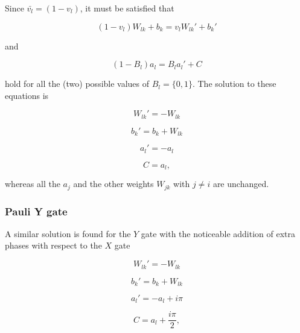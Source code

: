 Since $\bar{v_{l}} = (1-v_{l})$, it must be satisfied that

\begin{equation}
    (1-v_{l})W_{lk} + b_{k} = v_{l} W_{lk}\prime + b_{k}\prime
\end{equation}

and

\begin{equation}
   (1-B_{l}) a_{l} = B_{l} a_{l}\prime + C 
\end{equation}

hold for all the (two) possible values of $B_{l} = \{0,1\}$. The solution to these equations is

\begin{equation}
   W_{lk}\prime = -W_{lk}
\end{equation}

\begin{equation}
   b_{k}\prime = b_{k} + W_{lk}
\end{equation}

\begin{equation}
   a_{l}\prime = -a_{l}
\end{equation}

\begin{equation}
   C = a_{l},
\end{equation}

whereas all the $a_{j}$ and the other weights $W_{jk}$ with $j \neq i$ are unchanged.

\subsubsection{Pauli Y gate}
A similar solution is found for the $Y$ gate with the noticeable addition of extra phases
with respect to the $X$ gate

\begin{equation}
   W_{lk}\prime = -W_{lk}
\end{equation}

\begin{equation}
   b_{k}\prime = b_{k} + W_{lk}
\end{equation}

\begin{equation}
   a_{l}\prime = -a_{l} + i \pi
\end{equation}

\begin{equation}
   C = a_{l} + \frac{i \pi}{2},
\end{equation}


